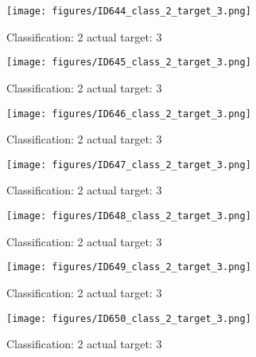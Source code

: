 \begin{figure}[h!]
\begin{center}
\texttt{[image: figures/ID644\_class\_2\_target\_3.png]}
\end{center}
\caption{ Classification: 2 actual target: 3}
\label{fig:ID644_class_2_target_3}
\end{figure}
\begin{figure}[h!]
\begin{center}
\texttt{[image: figures/ID645\_class\_2\_target\_3.png]}
\end{center}
\caption{ Classification: 2 actual target: 3}
\label{fig:ID645_class_2_target_3}
\end{figure}
\begin{figure}[h!]
\begin{center}
\texttt{[image: figures/ID646\_class\_2\_target\_3.png]}
\end{center}
\caption{ Classification: 2 actual target: 3}
\label{fig:ID646_class_2_target_3}
\end{figure}
\begin{figure}[h!]
\begin{center}
\texttt{[image: figures/ID647\_class\_2\_target\_3.png]}
\end{center}
\caption{ Classification: 2 actual target: 3}
\label{fig:ID647_class_2_target_3}
\end{figure}
\begin{figure}[h!]
\begin{center}
\texttt{[image: figures/ID648\_class\_2\_target\_3.png]}
\end{center}
\caption{ Classification: 2 actual target: 3}
\label{fig:ID648_class_2_target_3}
\end{figure}
\begin{figure}[h!]
\begin{center}
\texttt{[image: figures/ID649\_class\_2\_target\_3.png]}
\end{center}
\caption{ Classification: 2 actual target: 3}
\label{fig:ID649_class_2_target_3}
\end{figure}
\begin{figure}[h!]
\begin{center}
\texttt{[image: figures/ID650\_class\_2\_target\_3.png]}
\end{center}
\caption{ Classification: 2 actual target: 3}
\label{fig:ID650_class_2_target_3}
\end{figure}

